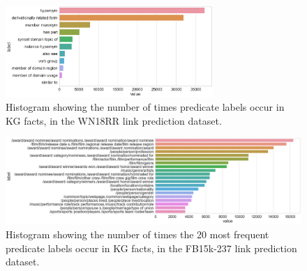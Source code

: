 \bigskip
\bigskip



\begin{figure}
   	\centering
    	\includegraphics[width=0.7\textwidth, height=0.3\textheight]{WN18RR_Predicate_Counts}
	\captionsetup{justification=centering}
	\caption{Histogram showing the number of times predicate labels occur in KG facts, in the WN18RR link prediction dataset.}
\end{figure}

\begin{figure}
   	\centering
    	\includegraphics[width=1.0\textwidth, height=0.3\textheight]{FB15k-237_Predicate_Counts}
	\captionsetup{justification=centering}
	\caption{Histogram showing the number of times the 20 most frequent predicate labels occur in KG facts, in the FB15k-237 link prediction dataset.}
\end{figure}



